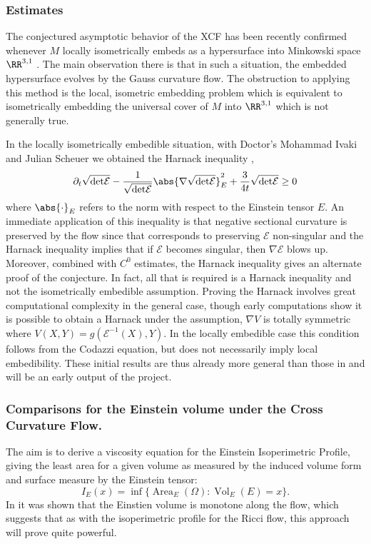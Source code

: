 \documentclass[12pt]{amsart}
\begin{document}
\subsubsection*{Estimates}
\label{sec-3-7-1}


The conjectured asymptotic behavior of the XCF has been recently confirmed whenever $M$ locally isometrically embeds as a hypersurface into Minkowski space $\RR^{3,1}$ \cite{MR3344442}. The main observation there is that in such a situation, the embedded hypersurface evolves by the Gauss curvature flow. The obstruction to applying this method is the local, isometric embedding problem which is equivalent to isometrically embedding the universal cover of $M$ into $\RR^{3,1}$ which is not generally true.

In the locally isometrically embedible situation, with Doctor's Mohammad Ivaki and Julian Scheuer we obtained the Harnack inequality \cite{BIS4},
\[
\partial_t \sqrt{{\det} \mathcal{E}} - \frac{1}{\sqrt{{\det}\mathcal{E}}} \abs{\nabla \sqrt{{\det}\mathcal{E}}}_E^2  + \frac{3}{4 t} \sqrt{{\det}\mathcal{E}} \geq 0
\]
where $\abs{\cdot}_E$ refers to the norm with respect to the Einstein tensor $E$. An immediate application of this inequality is that negative sectional curvature is preserved by the flow since that corresponds to preserving $\mathcal{E}$ non-singular and the Harnack inequality implies that if $\mathcal{E}$ becomes singular, then $\nabla \mathcal{E}$ blows up. Moreover, combined with $C^0$ estimates, the Harnack inequality gives an alternate proof of the conjecture. In fact, all that is required is a Harnack inequality and not the isometrically embedible assumption. Proving the Harnack involves great computational complexity in the general case, though early computations show it is possible to obtain a Harnack under the assumption, $\nabla V$ is totally symmetric where $V (X, Y) = g(\mathcal{E}^{-1}(X), Y)$. In the locally embedible case this condition follows from the Codazzi equation, but does not necessarily imply local embedibility. These initial results are thus already more general than those in \cite{MR3344442} and will be an early output of the project.

\subsubsection*{Comparisons for the Einstein volume under the Cross Curvature Flow.}
\label{sec-3-7-2}



The aim is to derive a viscosity equation for the Einstein Isoperimetric Profile, giving the least area for a given volume as measured by the induced volume form and surface measure by the Einstein tensor:
\[
I_E (x) = \inf\{\operatorname{Area}_E (\Omega) : \operatorname{Vol}_E (E) = x\}.
\]
In \cite{MR2055396} it was shown that the Einstien volume is monotone along the flow, which suggests that as with the isoperimetric profile for the Ricci flow, this approach will prove quite powerful.
\end{document}
